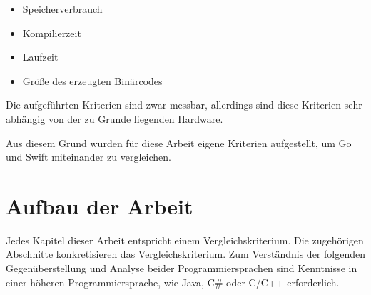 \begin{itemize}
    \item Speicherverbrauch
    \item Kompilierzeit
    \item Laufzeit
    \item Größe des erzeugten Binärcodes
\end{itemize}

Die aufgeführten Kriterien sind zwar messbar, allerdings sind diese Kriterien sehr abhängig von der zu Grunde liegenden Hardware.

Aus diesem Grund wurden für diese Arbeit eigene Kriterien aufgestellt, um Go und Swift miteinander zu vergleichen.

\section{Aufbau der Arbeit}
Jedes Kapitel dieser Arbeit entspricht einem Vergleichskriterium.
Die zugehörigen Abschnitte konkretisieren das Vergleichskriterium.
Zum Verständnis der folgenden Gegenüberstellung und Analyse beider Programmiersprachen sind Kenntnisse in einer höheren Programmiersprache, wie Java, C\# oder C/C++ erforderlich.